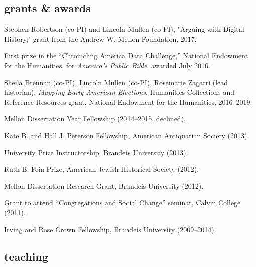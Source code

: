\documentclass[11pt]{article}
\begin{document}

% 

\subsection{grants \& awards}\label{grants-awards}

Stephen Robertson (co-PI) and Lincoln Mullen (co-PI), "Arguing with Digital 
History," grant from the Andrew W. Mellon Foundation, 2017.

First prize in the ``Chronicling America Data Challenge,'' National Endowment 
for the Humanities, for \emph{America's Public Bible}, awarded July 2016.

Sheila Brennan (co-PI), Lincoln Mullen (co-PI), Rosemarie Zagarri (lead 
historian), \emph{Mapping Early American Elections}, Humanities Collections 
and Reference Resources grant, National Endowment for the Humanities, 
2016--2019.

Mellon Dissertation Year Fellowship (2014--2015, declined).

Kate B. and Hall J. Peterson Fellowship, American Antiquarian Society (2013).

University Prize Instructorship, Brandeis University (2013).

Ruth B. Fein Prize, American Jewish Historical Society (2012).

Mellon Dissertation Research Grant, Brandeis University (2012).

Grant to attend ``Congregations and Social Change'' seminar, Calvin College 
(2011).

Irving and Rose Crown Fellowship, Brandeis University (2009--2014).

\subsection{teaching}\label{teaching}
\end{document}
